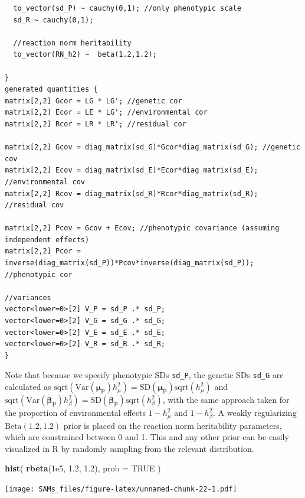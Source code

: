 \documentclass[
]{book}
\newenvironment{Shaded}{\begin{snugshade}}{\end{snugshade}}
\newcommand{\DataTypeTok}[1]{\textcolor[rgb]{0.13,0.29,0.53}{#1}}
\newcommand{\FloatTok}[1]{\textcolor[rgb]{0.00,0.00,0.81}{#1}}
\newcommand{\KeywordTok}[1]{\textcolor[rgb]{0.13,0.29,0.53}{\textbf{#1}}}
\newcommand{\NormalTok}[1]{#1}
\newcommand{\OtherTok}[1]{\textcolor[rgb]{0.56,0.35,0.01}{#1}}
\begin{document}
\begin{verbatim}
  to_vector(sd_P) ~ cauchy(0,1); //only phenotypic scale
  sd_R ~ cauchy(0,1);
  
  //reaction norm heritability
  to_vector(RN_h2) ~  beta(1.2,1.2);
  
}
generated quantities {
matrix[2,2] Gcor = LG * LG'; //genetic cor
matrix[2,2] Ecor = LE * LG'; //environmental cor
matrix[2,2] Rcor = LR * LR'; //residual cor 

matrix[2,2] Gcov = diag_matrix(sd_G)*Gcor*diag_matrix(sd_G); //genetic cov
matrix[2,2] Ecov = diag_matrix(sd_E)*Ecor*diag_matrix(sd_E); //environmental cov
matrix[2,2] Rcov = diag_matrix(sd_R)*Rcor*diag_matrix(sd_R); //residual cov

matrix[2,2] Pcov = Gcov + Ecov; //phenotypic covariance (assuming independent effects)
matrix[2,2] Pcor = inverse(diag_matrix(sd_P))*Pcov*inverse(diag_matrix(sd_P)); //phenotypic cor

//variances
vector<lower=0>[2] V_P = sd_P .* sd_P;
vector<lower=0>[2] V_G = sd_G .* sd_G;
vector<lower=0>[2] V_E = sd_E .* sd_E;
vector<lower=0>[2] V_R = sd_R .* sd_R;
}
\end{verbatim}

Note that because we specify phenotypic SDs \texttt{sd\_P}, the genetic SDs \texttt{sd\_G} are calculated as \(\mathrm{sqrt} ({\mathrm{Var}(\boldsymbol{\mu_{\mathrm{P}}})}h_{\mu}^{2})= {\mathrm{SD}(\boldsymbol{\mu_{\mathrm{P}}})}\mathrm{sqrt}(h_{\mu}^{2})\) and \(\mathrm{sqrt} ({\mathrm{Var}(\boldsymbol{\beta_{\mathrm{P}}})}h_{\beta}^{2})= {\mathrm{SD}(\boldsymbol{\beta_{\mathrm{P}}})}\mathrm{sqrt}(h_{\beta}^{2})\), with the same approach taken for the proportion of environmental effects \(1- h_{\mu}^{2}\) and \(1-h_{\beta}^{2}\). A weakly regularizing \(\mathrm{Beta}(1.2,1.2)\) prior is placed on the reaction norm heritability parameters, which are constrained between 0 and 1. This and any other prior can be easily visualized in R by randomly sampling from the relevant distribution.

\begin{Shaded}
\begin{Highlighting}[]
\KeywordTok{hist}\NormalTok{( }\KeywordTok{rbeta}\NormalTok{(}\FloatTok{1e5}\NormalTok{, }\FloatTok{1.2}\NormalTok{, }\FloatTok{1.2}\NormalTok{), }\DataTypeTok{prob =} \OtherTok{TRUE}\NormalTok{ )}
\end{Highlighting}
\end{Shaded}

\texttt{[image: SAMs\_files/figure-latex/unnamed-chunk-22-1.pdf]}
\end{document}

